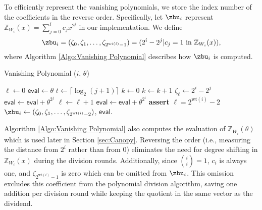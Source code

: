 To efficiently represent the vanishing polynomials, we store the index number of the coefficients in the reverse order. Specifically, let $\zbu_i$ represent $\mathbb{Z}_{W_{i}}(x) = \sum_{j=0}^{i} c_j x^{2^j}$ in our implementation. We define
\[
\zbu_i = (\zeta_0, \zeta_1, \ldots, \zeta_{2^{\text{wt}(i)}-1}) = (2^i-2^j | c_j=1\ \text{in}\ \mathbb{Z}_{W_{i}}(x)),
\]
where Algorithm \ref{Algo:Vanishing Polynomial} describes how $\zbu_i$ is computed.

\begin{algorithm}[h]
	\caption{Vanishing Polynomial ($i$, $\theta$)} \label{Algo:Vanishing Polynomial}
	\begin{algorithmic}[1]
	
		\State $\ell \gets 0$
		\State $\mathsf{eval} \gets \theta$
			\State $t \gets \lceil \log_2(j+1) \rceil$  
			\State	$k \gets 0$
				\State $k \gets k + 1$
			\EndWhile
				\State $\zeta_\ell \gets 2^i - 2^j$
				\State $\mathsf{eval} \gets \mathsf{eval} + \theta^{2^j}$
				\State $\ell \gets \ell + 1$ 
			\EndIf
		\EndFor
		\State $\mathsf{eval} \gets \mathsf{eval} + \theta^{2^i}$ 
		\State \textbf{assert} $\ell = 2^{\text{wt}(i)}-2$ 
		\State \Return $\zbu_i \gets (\zeta_0, \zeta_1, \ldots, \zeta_{2^{\text{wt}(i)}-2})$, $\mathsf{eval}$.
	\end{algorithmic}
\end{algorithm}

Algorithm \ref{Algo:Vanishing Polynomial} also computes the evaluation of $\mathbb{Z}_{W_{i}}(\theta)$ which is used later in Section \ref{sec:Canopy}. Reversing the order (i.e., measuring the distance from $2^i$ rather than from $0$) eliminates the need for degree shifting in $\mathbb{Z}_{W_{i}}(x)$ during the division rounds. Additionally, since ${i \choose i} = 1$, $c_i$ is always one, and $\zeta_{2^{\text{wt}(i)}-1}$ is zero which can be omitted from $\zbu_i$. This omission excludes this coefficient from the polynomial division algorithm, saving one addition per division round while keeping the quotient in the same vector as the dividend. 


